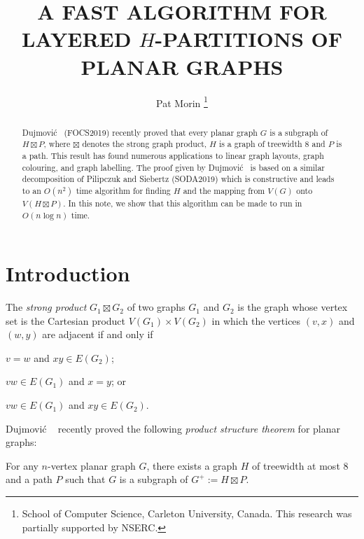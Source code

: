 \documentclass[kpfonts]{patmorin}
\title{\MakeUppercase{A Fast Algorithm for Layered $H$-Partitions of Planar Graphs}}
\author{
  Pat Morin%
    \thanks{School of Computer Science, Carleton University, Canada. This research was partially supported by NSERC.}
}
\date{}
\begin{document}
\maketitle

\begin{abstract}
  Dujmović \etal\  (FOCS2019) recently proved that every planar graph $G$ is a subgraph of $H\boxtimes P$, where $\boxtimes$ denotes the strong graph product, $H$ is a graph of treewidth 8 and $P$ is a path.  This result has found numerous applications to linear graph layouts, graph colouring, and graph labelling.  The proof given by Dujmović \etal\  is based on a similar decomposition of Pilipczuk and Siebertz (SODA2019) which is constructive and leads to an $O(n^2)$ time algorithm for finding $H$ and the mapping from $V(G)$ onto $V(H\boxtimes P)$.  In this note, we show that this algorithm can be made to run in $O(n\log n)$ time.
\end{abstract}

\section{Introduction}

The \emph{strong product} $G_1\boxtimes G_2$ of two graphs $G_1$ and $G_2$ is the graph whose vertex set is the Cartesian product $V(G_1)\times V(G_2)$ in which the vertices $(v,x)$ and $(w,y)$ are adjacent if and only if
\begin{compactitem}
  \item $v=w$ and $xy\in E(G_2)$;
  \item $vw\in E(G_1)$ and $x=y$; or
  \item $vw\in E(G_1)$ and $xy\in E(G_2)$.
\end{compactitem}
Dujmović \etal\  \cite{dujmovic.joret.ea:planar} recently proved the following \emph{product structure theorem} for planar graphs:

\begin{thm}
  For any $n$-vertex planar graph $G$, there exists a graph $H$ of treewidth at most 8 and a path $P$ such that $G$ is a subgraph of $G^+:=H\boxtimes P$.
\end{thm}
\end{document}
